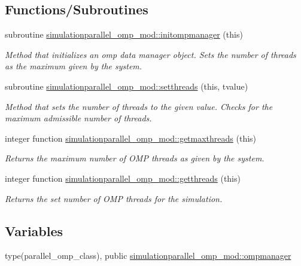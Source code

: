 \subsection*{Functions/\+Subroutines}
\begin{DoxyCompactItemize}
\item 
subroutine \mbox{\hyperlink{namespacesimulationparallel__omp__mod_a43af0d6de562e53dfbaa874bce957ba9}{simulationparallel\+\_\+omp\+\_\+mod\+::initompmanager}} (this)
\begin{DoxyCompactList}\small\item\em Method that initializes an omp data manager object. Sets the number of threads as the maximum given by the system. \end{DoxyCompactList}\item 
subroutine \mbox{\hyperlink{namespacesimulationparallel__omp__mod_ac5d0e4616b102fc7f4edddf8285fb61f}{simulationparallel\+\_\+omp\+\_\+mod\+::setthreads}} (this, tvalue)
\begin{DoxyCompactList}\small\item\em Method that sets the number of threads to the given value. Checks for the maximum admissible number of threads. \end{DoxyCompactList}\item 
integer function \mbox{\hyperlink{namespacesimulationparallel__omp__mod_af3219ed75e38a01f71255314b2cd9eee}{simulationparallel\+\_\+omp\+\_\+mod\+::getmaxthreads}} (this)
\begin{DoxyCompactList}\small\item\em Returns the maximum number of O\+MP threads as given by the system. \end{DoxyCompactList}\item 
integer function \mbox{\hyperlink{namespacesimulationparallel__omp__mod_a1f07ce2cf6390af06c3478e6271644e5}{simulationparallel\+\_\+omp\+\_\+mod\+::getthreads}} (this)
\begin{DoxyCompactList}\small\item\em Returns the set number of O\+MP threads for the simulation. \end{DoxyCompactList}\end{DoxyCompactItemize}
\subsection*{Variables}
\begin{DoxyCompactItemize}
\item 
type(parallel\+\_\+omp\+\_\+class), public \mbox{\hyperlink{namespacesimulationparallel__omp__mod_abc49bae2a6d752c9868b8b7bd233e740}{simulationparallel\+\_\+omp\+\_\+mod\+::ompmanager}}
\end{DoxyCompactItemize}
